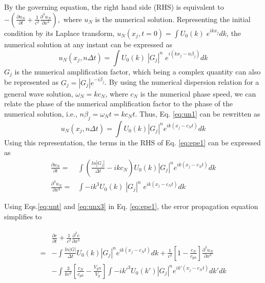 By the governing equation, the right hand side (RHS) is equivalent to 
$-(\frac{\partial u_N}{\partial t} + \frac{1}{c^2} \frac{\partial^3 u_N}{\partial x^3}),$
where $u_N$ is the numerical solution. Representing the initial condition by its Laplace transform, $ u_N(x_j,t=0) = \int U_0(k)\; e^{i k x_j} dk$, 
the numerical solution at any instant can be expressed as 
\begin{equation}
\label{eq:un1}
u_N(x_j,n\Delta t) = \int U_0(k)\; |G_j|^n\; e^{i(kx_j - n\beta_j)} dk
\end{equation}
$G_j$ is the numerical amplification factor, which being a complex quantity can also be represented as $G_j = |G_j|e^{-i\beta_j}$. By using the 
numerical dispersion relation for a general wave solution, $\omega_N = kc_N$, where $c_N$ is the numerical phase speed, we can relate the phase of 
the numerical amplification factor to the phase of the numerical solution, i.e., $n\beta_j = \omega_N t=kc_Nt$. Thus, Eq. \eqref{eq:un1} can be 
rewritten as
\begin{equation}
\label{eq:un2}
u_N(x_j,n\Delta t) = \int U_0(k) |G_j|^n e^{ik(x_j - c_Nt)} dk
\end{equation}
Using this representation, the terms in the RHS of Eq. \eqref{eq:epe1} can be expressed as
\begin{align}
\label{eq:unt}
\frac{\partial u_N}{\partial t}
  = &\int \left( \frac{ln|G_j|}{\Delta t}  -ikc_N \right)  U_0(k) |G_j|^n e^{ik(x_j - c_Nt)} dk\\
\label{eq:unx3}
\frac{\partial^3 u_N}{\partial x^3}
  = &\int -ik^3 U_0(k)\; |G_j|^n\; e^{ik(x_j - c_Nt)} dk 
\end{align}

Using Eqs.\eqref{eq:unt} and \eqref{eq:unx3} in Eq. \eqref{eq:epe1}, the error propagation equation simplifies to 

\begin{align}
\label{eq:epe2}
\begin{split}
&\frac{\partial e}{\partial t} + \frac{1}{c^2} \frac{\partial^3 e}{\partial x^3} \\
   = &-\int \frac{ln|G|}{\Delta t} U_0(k) |G_j|^n e^{ik(x_j - c_Nt)} dk 
     +\frac{1}{c^2}\left[1-\frac{c_N}{c_{ph}}\right]\frac{\partial^3 u_N}{\partial x^3}\\
     &- \int \frac{3}{kc^2}\left[\frac{c_N}{c_{ph}} - \frac{V_{gN}}{V_g}\right]\int -ik'^3 U_0(k') |G_j|^n e^{ik'(x_j - c_Nt)} dk' dk
     \end{split}
\end{align}

